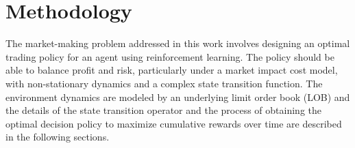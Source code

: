 \section{Methodology}
\label{sec:methodology}

The market-making problem addressed in this work involves designing an optimal trading policy for an agent using reinforcement learning.
The policy should be able to balance profit and risk, particularly under a market impact cost model,
with non-stationary dynamics and a complex state transition function.
The environment dynamics are modeled by an underlying limit order book (LOB) and
the details of the state transition operator and the process of obtaining the optimal decision policy to maximize cumulative rewards over time
are described in the following sections.






